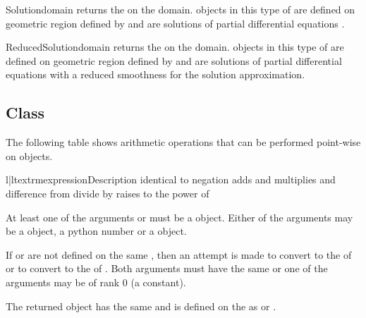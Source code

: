 \begin{funcdesc}{Solution}{domain}
returns the \SolutionFS on the \Domain domain. \Data objects in this type of \Function
are defined on geometric region defined by  and are solutions of
partial differential equations . 
\end{funcdesc}

\begin{funcdesc}{ReducedSolution}{domain}
returns the \ReducedSolutionFS on the \Domain domain. \Data objects in this type of \Function
are defined on geometric region defined by  and are solutions of
partial differential equations  with a reduced smoothness 
for the solution approximation.
\end{funcdesc}

\subsection{\Data Class}
\label{SEC ESCRIPT DATA}

The following table shows arithmetic operations that can be performed point-wise on
\Data objects.
\begin{tableii}{l|l}{textrm}{expression}{Description}
 {identical to  \index{+}}
 {negation\index{-}}
 {adds  and  \index{+}}
 {multiplies  and  \index{*}}
 {difference  from \index{-}}
 {divide  by  \index{/}}
 {raises  to the power of  \index{**}}
\end{tableii}
At least one of the arguments  or  must be a
\Data object.
Either of the arguments may be a \Data object, a python number or a \numpy object.

If  or  are
not defined on the same \FunctionSpace, then an attempt is made to convert 
to the \FunctionSpace of  or to convert  to
the \FunctionSpace of . Both arguments must have the same
\Shape or one of the arguments may be of rank 0 (a constant).

The returned \Data object has the same \Shape and is defined on
the \DataSamplePoints as  or .


